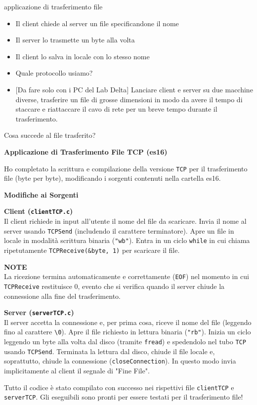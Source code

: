 \documentclass[11pt]{article}
\begin{document}
\begin{tcolorbox}[colback=blue!5!white,colframe=blue!75!black,title=\textbf{DOMANDA}, breakable]
applicazione di trasferimento file
\begin{itemize}
    \item Il client chiede al server un file specificandone il nome
    \item Il server lo trasmette un byte alla volta
    \item Il client lo salva in locale con lo stesso nome
    \item Quale protocollo usiamo?
    \item $[$Da fare solo con i PC del Lab Delta$]$ Lanciare client e server su due macchine diverse, trasferire un file di grosse dimensioni in modo da avere il tempo di staccare e riattaccare il cavo di rete per un breve tempo durante il trasferimento.
\end{itemize}
Cosa succede al file trasferito?
\end{tcolorbox}

\begin{tcolorbox}[colback=green!5!white,colframe=green!75!black,title=\textbf{RISPOSTA}, breakable]
\textbf{Applicazione di Trasferimento File TCP (es16)}

Ho completato la scrittura e compilazione della versione \texttt{TCP} per il trasferimento file (byte per byte), modificando i sorgenti contenuti nella cartella es16.

\textbf{Modifiche ai Sorgenti}

\textbf{Client (\texttt{clientTCP.c})}\\
Il client richiede in input all'utente il nome del file da scaricare. Invia il nome al server usando \texttt{TCPSend} (includendo il carattere terminatore). Apre un file in locale in modalità scrittura binaria (\texttt{"wb"}). Entra in un ciclo \texttt{while} in cui chiama ripetutamente \texttt{TCPReceive(\&byte, 1)} per scaricare il file.

\textbf{NOTE}\\
La ricezione termina automaticamente e correttamente (\texttt{EOF}) nel momento in cui \texttt{TCPReceive} restituisce 0, evento che si verifica quando il server chiude la connessione alla fine del trasferimento.

\textbf{Server (\texttt{serverTCP.c})}\\
Il server accetta la connessione e, per prima cosa, riceve il nome del file (leggendo fino al carattere \texttt{\textbackslash 0}). Apre il file richiesto in lettura binaria (\texttt{"rb"}). Inizia un ciclo leggendo un byte alla volta dal disco (tramite \texttt{fread}) e spedendolo nel tubo \texttt{TCP} usando \texttt{TCPSend}. Terminata la lettura dal disco, chiude il file locale e, soprattutto, chiude la connessione (\texttt{closeConnection}). In questo modo invia implicitamente al client il segnale di "Fine File".

Tutto il codice è stato compilato con successo nei rispettivi file \texttt{clientTCP} e \texttt{serverTCP}. Gli eseguibili sono pronti per essere testati per il trasferimento file!
\end{tcolorbox}
\end{document}
